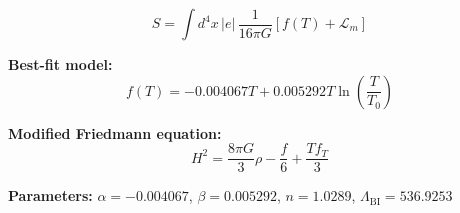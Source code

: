 
\begin{equation}
  S = \int d^4x \, |e| \, \frac{1}{16\pi G} \left[ f(T) + \mathcal{L}_m \right]
\end{equation}

\textbf{Best-fit model:}
\begin{equation}
  f(T) = -0.004067 T + 0.005292 T \ln\!\left(\frac{T}{T_0}\right)
\end{equation}

\textbf{Modified Friedmann equation:}
\begin{equation}
  H^2 = \frac{8\pi G}{3} \rho - \frac{f}{6} + \frac{T f_T}{3}
\end{equation}

\textbf{Parameters:}
$\alpha = -0.004067$, \quad
$\beta = 0.005292$, \quad
$n = 1.0289$, \quad
$\Lambda_{\text{BI}} = 536.9253$